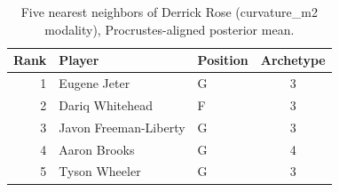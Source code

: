 \begin{table}[htbp]
  \centering\small
  \begin{tabular}{rllc}
    \toprule
    Rank & Player & Position & Archetype \\
    \midrule
    1 & Eugene Jeter & G & 3 \\
    2 & Dariq Whitehead & F & 3 \\
    3 & Javon Freeman-Liberty & G & 3 \\
    4 & Aaron Brooks & G & 4 \\
    5 & Tyson Wheeler & G & 3 \\
    \bottomrule
  \end{tabular}
  \caption{Five nearest neighbors of Derrick Rose (curvature_m2 modality), Procrustes-aligned posterior mean.}
  \label{tab:Derrick_Rose_neighbors_curvature_m2}
\end{table}

